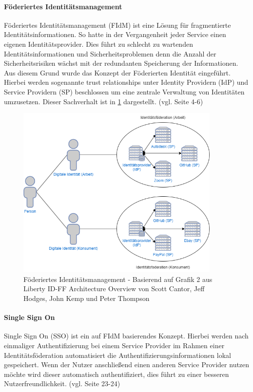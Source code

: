 \documentclass[11pt]{article}
\begin{document}
\paragraph{Föderiertes Identitätsmanagement}
Föderiertes Identitätsmanagement (FIdM) ist eine Lösung für fragmentierte Identitätsinformationen. So hatte in der Vergangenheit jeder Service einen eigenen Identitätsprovider. Dies führt zu schlecht zu wartenden Identitätsinformationen und Sicherheitsproblemen denn die Anzahl der Sicherheitsrisiken wächst mit der redundanten Speicherung der Informationen. Aus diesem Grund wurde das Konzept der Föderierten Identität eingeführt. Hierbei werden sogenannte \glqq{}trust relationships\grqq{} unter Identity Providern (IdP) und Service Providern (SP) beschlossen um eine zentrale Verwaltung von Identitäten umzusetzen. Dieser Sachverhalt ist in \cref{fig:fidm} dargestellt. (vgl. \cite{cantor2003liberty} Seite 4-6)
\begin{figure}[H]
  \centering
  \includegraphics[width=0.9\textwidth]{assets/federated.png}
  \caption{Föderiertes Identitätsmanagement - Basierend auf Grafik 2 aus Liberty ID-FF Architecture Overview von Scott Cantor, Jeff Hodges, John Kemp und Peter Thompson}\label{fig:fidm}
\end{figure}
\paragraph{Single Sign On}
Single Sign On (SSO) ist ein auf FIdM basierendes Konzept. Hierbei werden nach einmaliger Authentifizierung bei einem Service Provider im Rahmen einer Identitätsföderation automatisiert die Authentifizierungsinformationen lokal gespeichert. Wenn der Nutzer anschließend einen anderen Service Provider nutzen möchte wird dieser automatisch authentifiziert, dies führt zu einer besseren Nutzerfreundlichkeit. (vgl. \cite{cantor2003liberty} Seite 23-24)
\end{document}
